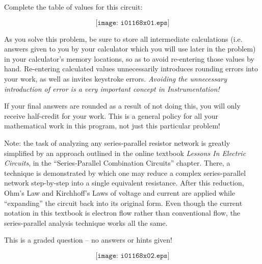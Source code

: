 

Complete the table of values for this circuit:

$$\texttt{[image: i01168x01.eps]}$$

As you solve this problem, be sure to store all intermediate calculations (i.e. answers given to you by your calculator which you will use later in the problem) in your calculator's memory locations, so as to avoid re-entering those values by hand.  Re-entering calculated values unnecessarily introduces rounding errors into your work, as well as invites keystroke errors.  {\it Avoiding the unnecessary introduction of error is a very important concept in Instrumentation!}

If your final answers are rounded as a result of not doing this, you will only receive half-credit for your work.  This is a general policy for all your mathematical work in this program, not just this particular problem!

\vfil 

Note: the task of analyzing any series-parallel resistor network is greatly simplified by an approach outlined in the online textbook {\it Lessons In Electric Circuits}, in the ``Series-Parallel Combination Circuits'' chapter.  There, a technique is demonstrated by which one may reduce a complex series-parallel network step-by-step into a single equivalent resistance.  After this reduction, Ohm's Law and Kirchhoff's Laws of voltage and current are applied while ``expanding'' the circuit back into its original form.  Even though the current notation in this textbook is electron flow rather than conventional flow, the series-parallel analysis technique works all the same.

\eject






This is a graded question -- no answers or hints given!







$$\texttt{[image: i01168x02.eps]}$$


